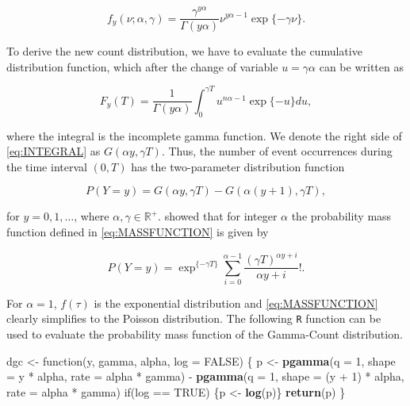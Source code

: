 \documentclass[9pt,a5paper,]{book}
\newenvironment{Shaded}{}{}
\newcommand{\KeywordTok}[1]{\textbf{{#1}}}
\newcommand{\DataTypeTok}[1]{\underline{{#1}}}
\newcommand{\DecValTok}[1]{{#1}}
\newcommand{\StringTok}[1]{{#1}}
\newcommand{\OtherTok}[1]{{#1}}
\newcommand{\NormalTok}[1]{{#1}}
\renewenvironment{Shaded}{\color{inputcolor}}{}
\renewcommand{\DataTypeTok}[1]{{#1}}
\theoremstyle{definition}
\theoremstyle{definition}
\theoremstyle{remark}
\begin{document}
\begin{equation}
f_y(\nu; \alpha, \gamma) = \frac{\gamma^{y\alpha}}{\Gamma(y\alpha)} \nu^{y\alpha-1} \exp\{-\gamma \nu\}.
\end{equation}

To derive the new count distribution, we have to evaluate the cumulative
distribution function, which after the change of variable
\(u = \gamma \alpha\) can be written as

\begin{equation}
F_y(T) = \frac{1}{\Gamma(y\alpha)} \int_0^{\gamma T} u^{n\alpha -1} \exp\{-u\} du,
\label{eq:INTEGRAL}
\end{equation}

where the integral is the incomplete gamma function. We denote the right
side of \eqref{eq:INTEGRAL} as \(G(\alpha y, \gamma T)\). Thus, the number
of event occurrences during the time interval \((0,T)\) has the
two-parameter distribution function

\begin{equation}
P(Y = y) = G(\alpha y, \gamma T) - G(\alpha (y + 1), \gamma T),
\label{eq:MASSFUNCTION}
\end{equation}

for \(y = 0, 1, \ldots\), where \(\alpha, \gamma \in \mathbb{R}^+\).
\citet{Winkelman1995} showed that for integer \(\alpha\) the probability
mass function defined in \eqref{eq:MASSFUNCTION} is given by

\begin{equation}
P(Y = y) = \exp^{\{-\gamma T\}} \sum_{i = 0}^{\alpha -1} \frac{(\gamma T)^{\alpha y + i}}{\alpha y + i}!.
\end{equation}

For \(\alpha = 1\), \(f(\tau)\) is the exponential distribution and
\eqref{eq:MASSFUNCTION} clearly simplifies to the Poisson distribution.
The following \texttt{R} function can be used to evaluate the
probability mass function of the Gamma-Count distribution.

\begin{Shaded}
\begin{Highlighting}[]
\NormalTok{dgc <-}\StringTok{ }\NormalTok{function(y, gamma, alpha, }\DataTypeTok{log =} \OtherTok{FALSE}\NormalTok{) \{}
  \NormalTok{p <-}\StringTok{ }\KeywordTok{pgamma}\NormalTok{(}\DataTypeTok{q =} \DecValTok{1}\NormalTok{,}
              \DataTypeTok{shape =} \NormalTok{y *}\StringTok{ }\NormalTok{alpha,}
              \DataTypeTok{rate =} \NormalTok{alpha *}\StringTok{ }\NormalTok{gamma) -}
\StringTok{    }\KeywordTok{pgamma}\NormalTok{(}\DataTypeTok{q =} \DecValTok{1}\NormalTok{,}
           \DataTypeTok{shape =} \NormalTok{(y +}\StringTok{ }\DecValTok{1}\NormalTok{) *}\StringTok{ }\NormalTok{alpha,}
           \DataTypeTok{rate =} \NormalTok{alpha *}\StringTok{ }\NormalTok{gamma)}
  \NormalTok{if(log ==}\StringTok{ }\OtherTok{TRUE}\NormalTok{) \{p <-}\StringTok{ }\KeywordTok{log}\NormalTok{(p)\}}
  \KeywordTok{return}\NormalTok{(p)}
\NormalTok{\}}
\end{Highlighting}
\end{Shaded}
\end{document}
